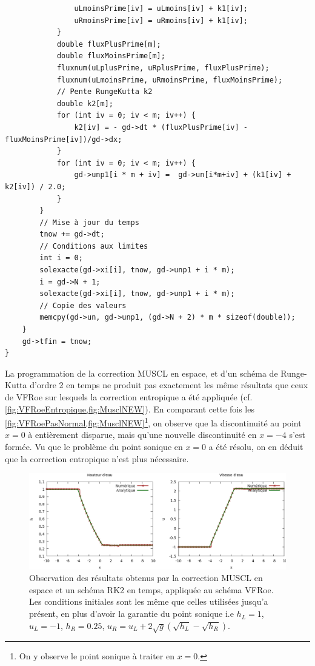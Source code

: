 \documentclass[
	french,
	11pt, %
]{fphw}
\begin{document}
\begin{lstlisting}
                uLmoinsPrime[iv] = uLmoins[iv] + k1[iv];
                uRmoinsPrime[iv] = uRmoins[iv] + k1[iv];
            }
            double fluxPlusPrime[m];
            double fluxMoinsPrime[m];
            fluxnum(uLplusPrime, uRplusPrime, fluxPlusPrime);
            fluxnum(uLmoinsPrime, uRmoinsPrime, fluxMoinsPrime);
			// Pente RungeKutta k2
            double k2[m]; 
            for (int iv = 0; iv < m; iv++) {
                k2[iv] = - gd->dt * (fluxPlusPrime[iv] - fluxMoinsPrime[iv])/gd->dx;
            }
            for (int iv = 0; iv < m; iv++) {
                gd->unp1[i * m + iv] =  gd->un[i*m+iv] + (k1[iv] + k2[iv]) / 2.0;
            }
        }
        // Mise à jour du temps
        tnow += gd->dt;
		// Conditions aux limites
        int i = 0;
        solexacte(gd->xi[i], tnow, gd->unp1 + i * m);
        i = gd->N + 1;
        solexacte(gd->xi[i], tnow, gd->unp1 + i * m);
		// Copie des valeurs
        memcpy(gd->un, gd->unp1, (gd->N + 2) * m * sizeof(double));
    }
    gd->tfin = tnow;
}
\end{lstlisting}
	
\noindent La programmation de la correction MUSCL en espace, et d'un schéma de Runge-Kutta d'ordre 2 en temps ne produit pas exactement les même résultats que ceux de VFRoe sur lesquels la correction entropique a été appliquée (cf. \cref{fig:VFRoeEntropique,fig:MusclNEW}). En comparant cette fois les \cref{fig:VFRoePasNormal,fig:MusclNEW}\footnote{On y observe le point sonique à traiter en $x=0$.}, on observe que la discontinuité au point $x=0$ à entièrement disparue, mais qu'une nouvelle discontinuité en $x=-4$ s'est formée. Vu que le problème du point sonique en $x=0$ a été résolu, on en déduit que la correction entropique n'est plus nécessaire.


\begin{figure}[H]
	\centering
	\includegraphics[width=\textwidth]{MusclNEW2.png}
	\caption{Observation des résultats obtenus par la correction MUSCL en espace et un schéma RK2 en temps, appliquée au schéma VFRoe. Les conditions initiales sont les même que celles utilisées jusqu'a présent, en plus d'avoir la garantie du point sonique i.e $h_L=1$, $u_L=-1$, $h_R=0.25$, $u_R = u_L + 2\sqrt{g}(\sqrt{h_L}-\sqrt{h_R})$.}
	\label{fig:MusclNEW}
\end{figure}
\end{document}
